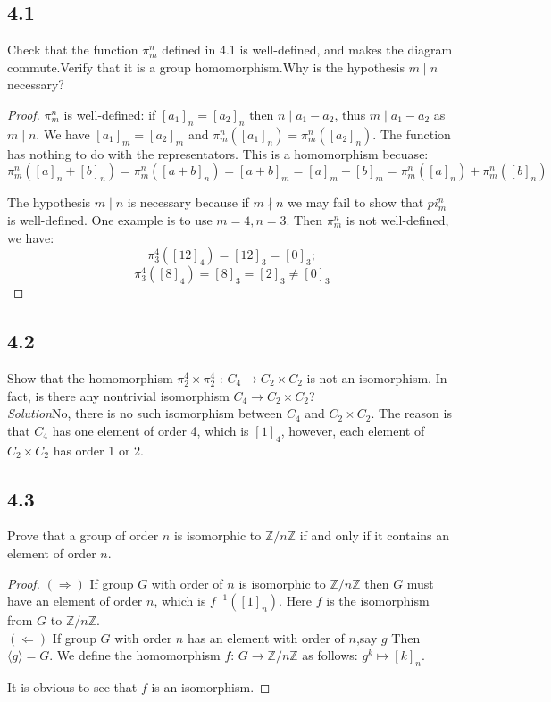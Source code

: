 \documentclass[a4paper, pdf, 12pt]{article}
\newcommand{\divides}{\mid}
\newcommand{\notdivides}{\nmid}
\begin{document}
\subsection*{4.1}
Check that the function $\pi_{m}^{n}$
defined in 4.1 is well-defined, and makes the
diagram commute.Verify that it is a group homomorphism.Why is the hypothesis
$m \divides n$ necessary?
\begin{proof}
  $\pi_{m}^{n}$ is well-defined: if $[a_1]_{n}=[a_2]_{n}$ then $n\divides a_1-a_2$, thus
  $m\divides a_1-a_2$ as $m\divides n$. We have $[a_1]_{m}=[a_2]_{m}$ and
  $\pi_{m}^{n}([a_1]_{n}) = \pi_{m}^{n}([a_2]_{n})$. The function has nothing to do with the
  representators.
  This is a homomorphism becuase:
  $$
    \pi_{m}^{n}([a]_{n}+[b]_{n}) = \pi_{m}^{n}([a+b]_{n}) = [a+b]_{m} = [a]_{m} + [b]_{m} = \pi_{m}^{n}([a]_{n}) + \pi_{m}^{n}([b]_{n})
  $$

  The hypothesis $m\divides n$ is necessary because if $m\notdivides n$ we may fail to show
  that $pi_{m}^{n}$ is well-defined.
  One example is to use $m = 4, n = 3$. Then $\pi_{m}^{n}$ is not well-defined, we have:
  $$
    \pi_{3}^{4}([12]_{4}) = [12]_{3} = [0]_{3};
  $$
  $$
    \pi_{3}^{4}([8]_{4}) = [8]_{3} = [2]_{3} \neq [0]_{3}
  $$
\end{proof}

\subsection*{4.2}
Show that the homomorphism $\pi_{2}^{4}\times \pi_{2}^{4}$
: $C_4\rightarrow C_2\times C_2$ is not an isomorphism.
In fact, is there any nontrivial isomorphism $C_4\rightarrow C_2\times C_2$?\\

\noindent
\textit{Solution}\quad No, there is no such isomorphism between $C_4$ and $C_2\times C_2$.
The reason is that $C_4$ has one element of order 4, which is $[1]_{4}$, however, each element of $C_2\times C_2$ has order 1 or 2.

\subsection*{4.3}
Prove that a group of order $n$ is isomorphic to $\mathbb{Z}/n \mathbb{Z}$ if and only if it contains
an element of order $n$.
\begin{proof}
  $(\Rightarrow)$ If group $G$ with order of $n$ is isomorphic to $\mathbb{Z}/n\mathbb{Z}$ then $G$ must have
  an element of order $n$, which is $f^{-1}([1]_{n})$. Here $f$ is the isomorphism from $G$ to $\mathbb{Z}/n\mathbb{Z}$.
  \\
  $(\Leftarrow)$ If group $G$ with order $n$ has an element with order of $n$,say $g$ Then $\langle g\rangle = G$. We define the
  homomorphism $f$: $G\rightarrow \mathbb{Z}/n\mathbb{Z}$ as follows: $g^{k}\mapsto [k]_{n}$.

  \noindent
  It is obvious to see that $f$ is an isomorphism.
\end{proof}
\end{document}
